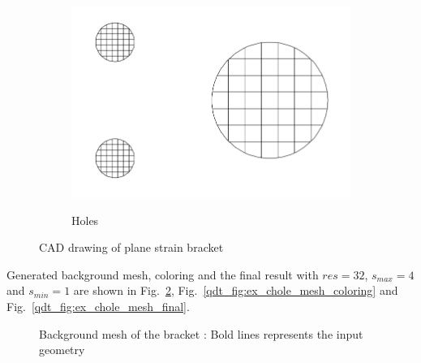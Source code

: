 \begin{figure}[H]
\begin{subfigure}[b]{0.4\linewidth}
{                \includegraphics{quadtree/ex_images/ex_bracket_cad_holes.png}
            }
            \caption{Holes}
        \end{subfigure}
        \caption{CAD drawing of plane strain bracket}
        \label{qdt_fig:ex_bracket_cad}
    \end{figure}
Generated background mesh, coloring and the final result with $res=32$, $s_{max}=4$ and $s_{min}=1$ are shown in Fig.~\ref{qdt_fig:ex_chole_background_mesh}, Fig.~\ref{qdt_fig:ex_chole_mesh_coloring} and Fig.~\ref{qdt_fig:ex_chole_mesh_final}.
\begin{figure}
    \centering
    \caption[Background mesh of the bracket]{Background mesh of the bracket : Bold lines represents the input geometry}
    \label{qdt_fig:ex_chole_background_mesh}
\end{figure}

